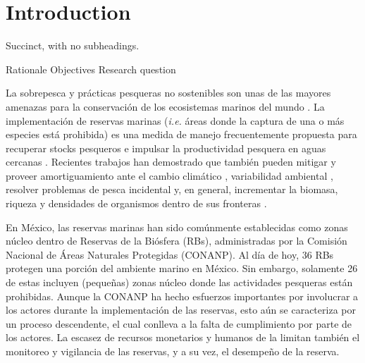 \documentclass{frontiersSCNS}
\begin{document}
\section{Introduction}\label{introduction}

Succinct, with no subheadings.

Rationale Objectives Research question

La sobrepesca y prácticas pesqueras no sostenibles son unas de las
mayores amenazas para la conservación de los ecosistemas marinos del
mundo \citep{halpern_2008-dK,halpern_2017-Zi}. La implementación de
reservas marinas (\emph{i.e.} áreas donde la captura de una o más
especies está prohibida) es una medida de manejo frecuentemente
propuesta para recuperar stocks pesqueros e impulsar la productividad
pesquera en aguas cercanas
\citep{afflerbach_2014-HP,krueck_2017-J1,sala_2017-69}. Recientes
trabajos han demostrado que también pueden mitigar y proveer
amortiguamiento ante el cambio climático \citep{roberts_2017-J9},
variabilidad ambiental \citep{micheli_2012-EU}, resolver problemas de
pesca incidental \citep{hastings_2017-sm} y, en general, incrementar la
biomasa, riqueza y densidades de organismos dentro de sus fronteras
\citep{lester_2009-Ks,giakoumi_2017-V2,sala_2017-69}.

En México, las reservas marinas han sido comúnmente establecidas como
zonas núcleo dentro de Reservas de la Biósfera (RBs), administradas por
la Comisión Nacional de Áreas Naturales Protegidas (CONANP). Al día de
hoy, 36 RBs protegen una porción del ambiente marino en México. Sin
embargo, solamente 26 de estas incluyen (pequeñas) zonas núcleo donde
las actividades pesqueras están prohibidas. Aunque la CONANP ha hecho
esfuerzos importantes por involucrar a los actores durante la
implementación de las reservas, esto aún se caracteriza por un proceso
descendente, el cual conlleva a la falta de cumplimiento por parte de
los actores. La escasez de recursos monetarios y humanos de la limitan
también el monitoreo y vigilancia de las reservas, y a su vez, el
desempeño de la reserva.
\end{document}
